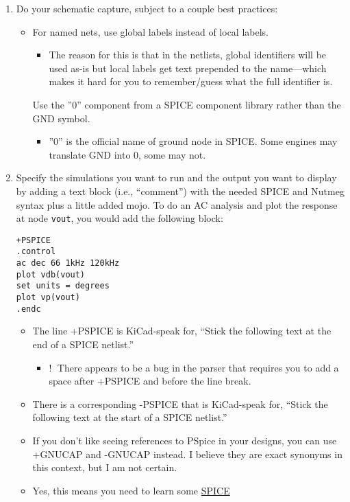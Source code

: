 \begin{enumerate}
  \item
Do your schematic capture, subject to a couple best practices:
\begin{itemize}
  \item
For named nets, use global labels instead of local labels.
\begin{itemize}
  \item
The reason for this is that in the netlists, global identifiers will be used
as-is but local labels get text prepended to the name—which makes it hard for
you to remember/guess what the full identifier is.
\end{itemize}
Use the ”0” component from a SPICE component library rather than the GND symbol.
\begin{itemize}
  \item
”0” is the official name of ground node in SPICE. Some engines may translate GND
into 0, some may not.
\end{itemize}
\end{itemize}
  \item
Specify the simulations you want to run and the output you want to display by
adding a text block (i.e., “comment”) with the needed SPICE and Nutmeg syntax
plus a little added mojo. To do an AC analysis and plot the response at node
\verb|vout|, you would add the following block:
\begin{lstlisting}
+PSPICE
.control
ac dec 66 1kHz 120kHz
plot vdb(vout)
set units = degrees
plot vp(vout)
.endc
\end{lstlisting}
\begin{itemize}
  \item
The line +PSPICE is KiCad-speak for, “Stick the following text at the end of a
SPICE netlist.”
\begin{itemize}
  \item
\textcircled{!} There appears to be a bug in the parser that requires you to add
a space after +PSPICE and before the line break.
\end{itemize}
  \item
There is a corresponding -PSPICE that is KiCad-speak for, “Stick the following
text at the start of a SPICE netlist.”
  \item
If you don't like seeing references to PSpice in your designs, you can use
+GNUCAP and -GNUCAP instead. I believe they are exact synonyms in this context,
but I am not certain.
  \item
Yes, this means you need to learn some
\href{http://newton.ex.ac.uk/teaching/cdhw/Electronics2/userguide/sec5.html}{SPICE
}
\end{itemize}
\end{enumerate}
